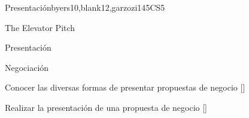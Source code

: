 \begin{syllabus}
   \begin{unit}{}{Presentación}{byers10,blank12,garzozi14}{5}{CS5}
      \begin{topics}
         \item The Elevator Pitch
         \item Presentación
         \item Negociación
       \end{topics}
   
      \begin{learningoutcomes} 
         \item Conocer las diversas formas de presentar propuestas de negocio  [\Familiarity]
         \item Realizar la presentación de una propuesta de negocio  [\Usage]
      \end{learningoutcomes} 
   \end{unit}
   
   \begin{coursebibliography}
   \end{coursebibliography}
   
   \end{syllabus}
   
   